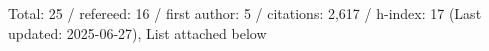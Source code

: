 Total: 25 / refereed: 16 / first author: 5 / citations: 2,617 / h-index: 17 (Last updated: 2025-06-27), List attached below